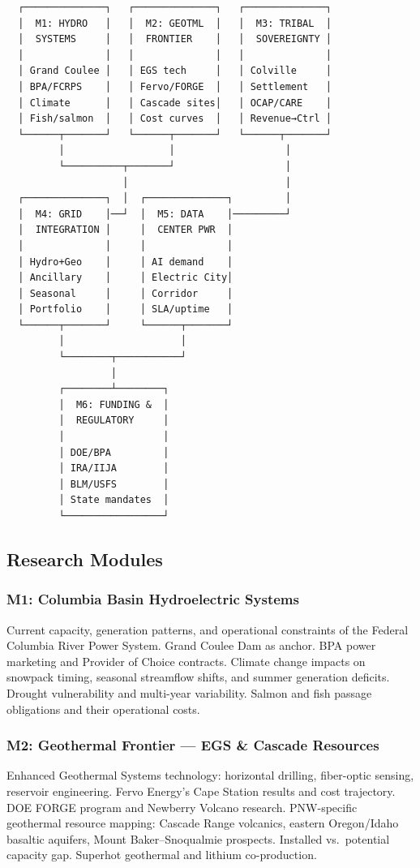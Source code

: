 \documentclass[11pt,letterpaper]{article}
\begin{document}
\begin{asciibox}
\begin{verbatim}
  ┌──────────────┐   ┌──────────────┐   ┌──────────────┐
  │  M1: HYDRO   │   │  M2: GEOTML  │   │  M3: TRIBAL  │
  │  SYSTEMS     │   │  FRONTIER    │   │  SOVEREIGNTY │
  │              │   │              │   │              │
  │ Grand Coulee │   │ EGS tech     │   │ Colville     │
  │ BPA/FCRPS    │   │ Fervo/FORGE  │   │ Settlement   │
  │ Climate      │   │ Cascade sites│   │ OCAP/CARE    │
  │ Fish/salmon  │   │ Cost curves  │   │ Revenue→Ctrl │
  └──────┬───────┘   └──────┬───────┘   └──────┬───────┘
         │                  │                   │
         └──────────┬───────┘                   │
                    │                           │
  ┌──────────────┐  │  ┌──────────────┐         │
  │  M4: GRID    │──┘  │  M5: DATA    │─────────┘
  │  INTEGRATION │     │  CENTER PWR  │
  │              │     │              │
  │ Hydro+Geo    │     │ AI demand    │
  │ Ancillary    │     │ Electric City│
  │ Seasonal     │     │ Corridor     │
  │ Portfolio    │     │ SLA/uptime   │
  └──────┬───────┘     └──────┬───────┘
         │                    │
         └────────┬───────────┘
                  │
         ┌────────┴────────┐
         │  M6: FUNDING &  │
         │  REGULATORY     │
         │                 │
         │ DOE/BPA         │
         │ IRA/IIJA        │
         │ BLM/USFS        │
         │ State mandates  │
         └─────────────────┘
\end{verbatim}
\end{asciibox}

\subsection{Research Modules}

\subsubsection{M1: Columbia Basin Hydroelectric Systems}
Current capacity, generation patterns, and operational constraints of the Federal Columbia River Power System. Grand Coulee Dam as anchor. BPA power marketing and Provider of Choice contracts. Climate change impacts on snowpack timing, seasonal streamflow shifts, and summer generation deficits. Drought vulnerability and multi-year variability. Salmon and fish passage obligations and their operational costs.

\subsubsection{M2: Geothermal Frontier --- EGS \& Cascade Resources}
Enhanced Geothermal Systems technology: horizontal drilling, fiber-optic sensing, reservoir engineering. Fervo Energy's Cape Station results and cost trajectory. DOE FORGE program and Newberry Volcano research. PNW-specific geothermal resource mapping: Cascade Range volcanics, eastern Oregon/Idaho basaltic aquifers, Mount Baker--Snoqualmie prospects. Installed vs.\ potential capacity gap. Superhot geothermal and lithium co-production.
\end{document}
